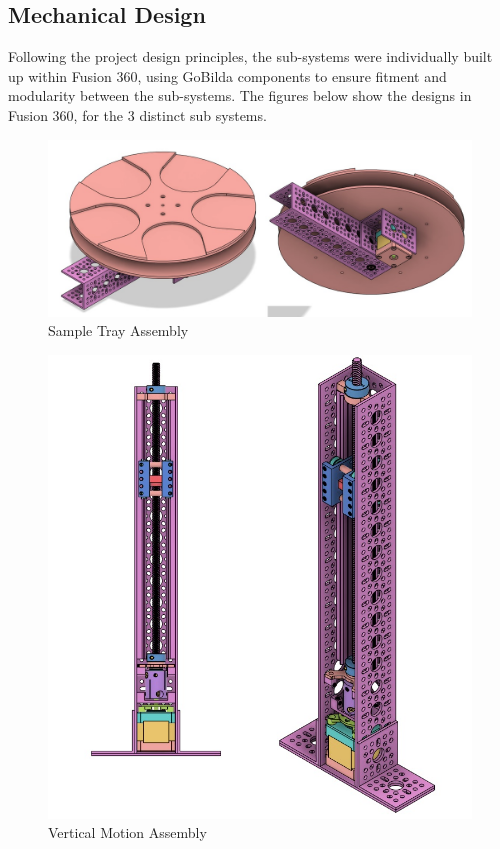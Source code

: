 \documentclass{UoNMCHA}
\numberwithin{equation}{section}
\begin{document}
\subsection{Mechanical Design}
Following the project design principles, the sub-systems were individually built up within Fusion 360, using GoBilda components to ensure fitment and modularity between the sub-systems.\newline
The figures below show the designs in Fusion 360, for the 3 distinct sub systems.\\
\begin{figure}[H]
	\centering
	\includegraphics[width=1\textwidth]{SAMPLE_TRAY_ASSEM.jpg}
	\caption{Sample Tray Assembly}
	\label{fig:Sample Tray Assembly}
\end{figure}
\begin{figure}[H]
	\centering
	\includegraphics[width=1\textwidth]{VERT_MOVE_SUBASSEM.jpg}
	\caption{Vertical Motion Assembly}
	\label{fig:Vertical Motion Assembly}
\end{figure}
\end{document}
